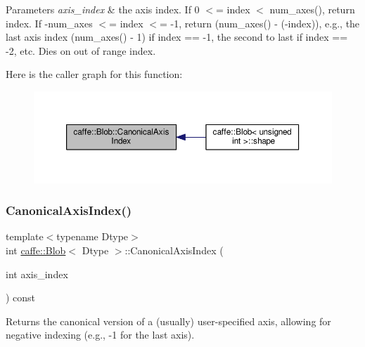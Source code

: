 \begin{DoxyParams}{Parameters}
{\em axis\+\_\+index} & the axis index. If 0 $<$= index $<$ num\+\_\+axes(), return index. If -\/num\+\_\+axes $<$= index $<$= -\/1, return (num\+\_\+axes() -\/ (-\/index)), e.\+g., the last axis index (num\+\_\+axes() -\/ 1) if index == -\/1, the second to last if index == -\/2, etc. Dies on out of range index. \\
\hline
\end{DoxyParams}
Here is the caller graph for this function\+:
\nopagebreak
\begin{figure}[H]
\begin{center}
\leavevmode
\includegraphics[width=350pt]{classcaffe_1_1_blob_ad686f5ed9994046f2c741bfa81118509_icgraph}
\end{center}
\end{figure}
\mbox{\label{classcaffe_1_1_blob_ad686f5ed9994046f2c741bfa81118509}} 
\subsubsection{\texorpdfstring{Canonical\+Axis\+Index()}{CanonicalAxisIndex()}\hspace{0.1cm}{\footnotesize\ttfamily [2/2]}}
{\footnotesize\ttfamily template$<$typename Dtype$>$ \\
int \mbox{\hyperlink{classcaffe_1_1_blob}{caffe\+::\+Blob}}$<$ Dtype $>$\+::Canonical\+Axis\+Index (\begin{DoxyParamCaption}\item[{int}]{axis\+\_\+index }\end{DoxyParamCaption}) const\hspace{0.3cm}{\ttfamily [inline]}}



Returns the \textquotesingle{}canonical\textquotesingle{} version of a (usually) user-\/specified axis, allowing for negative indexing (e.\+g., -\/1 for the last axis). 


